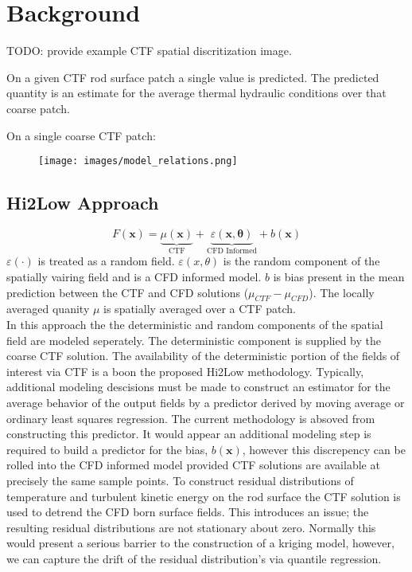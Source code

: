 

\section{Background}

TODO: provide example CTF spatial discritization image.

On a given CTF rod surface patch a single value is predicted.  The predicted quantity is an estimate for the average thermal hydraulic conditions over that coarse patch.

On a single coarse CTF patch:
\begin{figure}[!htbp]
\centering
\texttt{[image: images/model\_relations.png]}
\label{model_overview}
\end{figure}

\subsection{Hi2Low Approach}
\begin{equation}
    F(\mathbf x) = \underbrace{\mu(\mathbf{x})}_\text{CTF} + \underbrace{\varepsilon(\mathbf{x, \theta})}_\text{CFD Informed} + b(\mathbf{x})
\end{equation}
 $ \varepsilon(\cdot) $ is treated as a random field.  $\varepsilon(x, \theta)$ is the random component of the spatially vairing field and is a CFD informed model.
$b$ is bias present in the mean prediction between the CTF and CFD solutions ($\mu_{CTF} - \mu_{CFD}$).
The locally averaged quanity $\mu$ is spatially averaged over a CTF patch. \\

In this approach the the deterministic and random components of the spatial field are modeled seperately.  The deterministic component is supplied by the coarse CTF solution.
The availability of the deterministic portion of the fields of interest via CTF is a boon the proposed Hi2Low methodology.  Typically, additional modeling descisions must be made to construct an estimator for the average behavior of the output fields by a predictor derived by moving average or ordinary least squares regression.  The current methodology is absoved from constructing this predictor.
It would appear an additional modeling step is required to build a predictor for the bias, $b(\mathbf{x})$, however this discrepency can be rolled into the
CFD informed model provided CTF solutions are available at precisely the same sample points.
To construct residual distributions of temperature and turbulent kinetic energy on the rod surface the CTF solution is used to detrend the CFD born surface fields.  This introduces an issue; the resulting residual distributions are not stationary about zero.  Normally this would present
a serious barrier to the construction of a kriging model, however, we can capture the drift of the residual distribution's via quantile regression.

